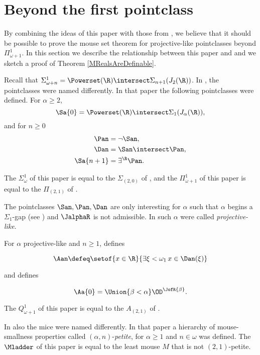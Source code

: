 \documentclass[oneside,12pt]{amsart}
\begin{document}
\section{Beyond the first pointclass}
\label{section:beyond_first_pointclass}

By combining the ideas of this paper with those from
\cite{Mouse_Sets}, we believe that it should be possible to prove the mouse set theorem
for projective-like pointclasses beyond $\Pi^1_{\omega+1}$. In this section we
describe the relationship between this paper and \cite{Mouse_Sets} and we
sketch a proof of Theorem \ref{MRealsAreDefinable}.

Recall that $\Sigma^1_{\omega+n} = \Powerset(\R)\intersect \Sigma_{n+1}(J_2(\R))$.
In \cite{Mouse_Sets}, the pointclasses were named differently. In that paper
the following pointclasses were defined. For $\alpha\geq 2$,
$$\Sa{0}=\Powerset(\R)\intersect \Sigma_{1}(J_{\alpha}(\R)),$$
and for $n\geq 0$
\begin{align*}
\Pan &= \neg \San, \\
\Dan &= \San \intersect \Pan, \\
\Sa{n+1} &= \exists^{\R} \Pan.
\end{align*}

The $\Sigma^1_{\omega}$ of this paper is equal
to the $\Sigma_{(2,0)}$ of \cite{Mouse_Sets}, and the
$\Pi^1_{\omega+1}$ of this paper is
equal to the $\Pi_{(2,1)}$ of \cite{Mouse_Sets}.

The pointclasses $\San,\Pan,\Dan$ are only interesting for $\alpha$ such that
$\alpha$ begins a $\Sigma_1$-gap (see \cite{Scales_In_LofR})
and $\JalphaR$ is not admissible. In
\cite{Mouse_Sets} such $\alpha$ were called \emph{projective-like}.

For $\alpha$ projective-like and $n\geq 1$, \cite{Mouse_Sets} defines

$$\Aan\defeq\setof{x\in\R}{\exists \xi<\omega_1\, x\in \Dan(\xi)}$$

and defines

$$\Aa{0} = \Union{\beta<\alpha} \OD^{\JofR{\beta}}.$$

The $Q^1_{\omega+1}$ of this paper is equal to the $A_{(2,1)}$ of \cite{Mouse_Sets}.

In \cite{Mouse_Sets} also the mice were named differently. In that paper
a hierarchy of mouse-smallness properties called $(\alpha,n)$-\emph{petite}, for $\alpha\geq 1$
and $n\in\omega$ was defined. The $\Mladder$ of this paper is equal to the least mouse
$M$ that is not $(2,1)$-petite.
\end{document}
